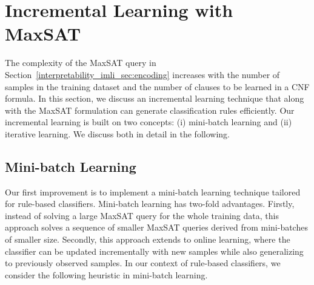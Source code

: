 \section{Incremental Learning with MaxSAT}
\label{interpretability_imli_sec:incremental_learning}
The complexity of the MaxSAT query in Section~\ref{interpretability_imli_sec:encoding} increases with the number of samples in the training dataset and the number of clauses to be learned in a CNF formula. In this section, we discuss an incremental learning technique that along with the MaxSAT formulation can generate classification rules efficiently. Our incremental learning is built on two concepts: (i)
mini-batch learning and (ii) iterative learning. We discuss both in detail in the following.

\subsection{Mini-batch Learning} 

Our first improvement is to implement a mini-batch learning technique tailored for rule-based classifiers. Mini-batch learning has two-fold advantages. Firstly, instead of solving a large MaxSAT query for the whole training data, this approach solves a sequence of smaller MaxSAT queries derived from mini-batches of smaller size.  Secondly, this approach extends to online learning, where the classifier can be updated incrementally with new samples while also generalizing to previously observed samples. In our context of rule-based classifiers, we consider the following heuristic in mini-batch learning.


